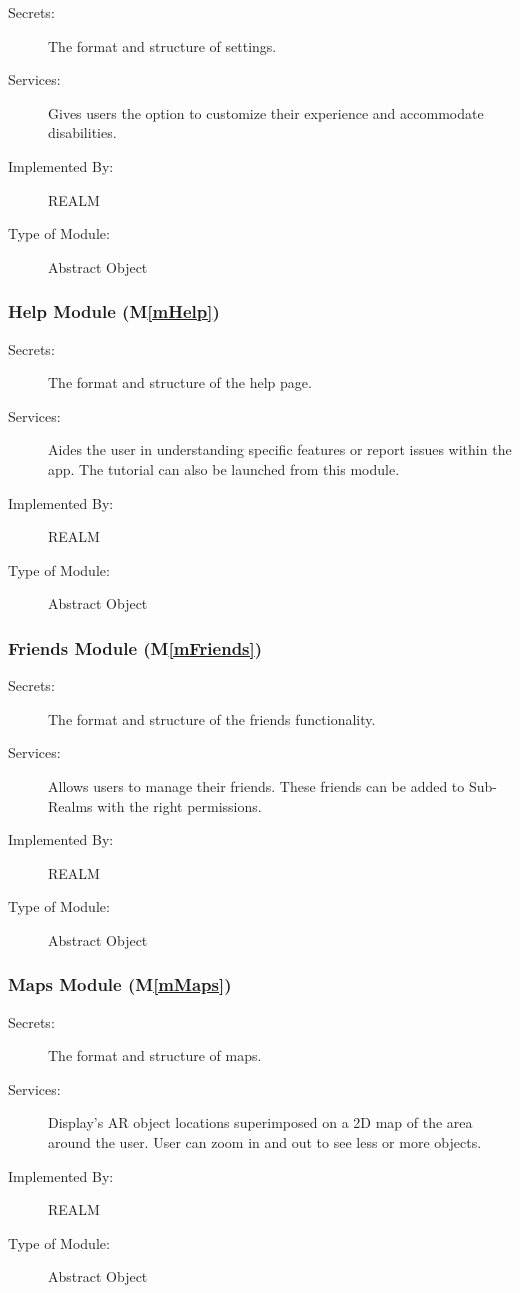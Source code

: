 \documentclass[12pt, titlepage]{article}
\newcommand{\mref}[1]{M\ref{#1}}
\begin{document}
\begin{description}
\item[Secrets:]The format and structure of settings.
\item[Services:]Gives users the option to customize their experience and accommodate disabilities.
\item[Implemented By:]REALM
\item[Type of Module:]Abstract Object
\end{description}

\subsubsection{Help Module (\mref{mHelp})}

\begin{description}
\item[Secrets:]The format and structure of the help page.
\item[Services:]Aides the user in understanding specific features or report issues within the app. The tutorial can also be launched from this module.
\item[Implemented By:]REALM
\item[Type of Module:]Abstract Object
\end{description}

\subsubsection{Friends Module (\mref{mFriends})}

\begin{description}
\item[Secrets:]The format and structure of the friends functionality.
\item[Services:]Allows users to manage their friends. These friends can be added to Sub-Realms with the right permissions.
\item[Implemented By:]REALM
\item[Type of Module:]Abstract Object
\end{description}

\subsubsection{Maps Module (\mref{mMaps})}

\begin{description}
\item[Secrets:]The format and structure of maps.
\item[Services:]Display's AR object locations superimposed on a 2D map of the area around the user. User can zoom in and out to see less or more objects.
\item[Implemented By:]REALM
\item[Type of Module:]Abstract Object
\end{description}
\end{document}
